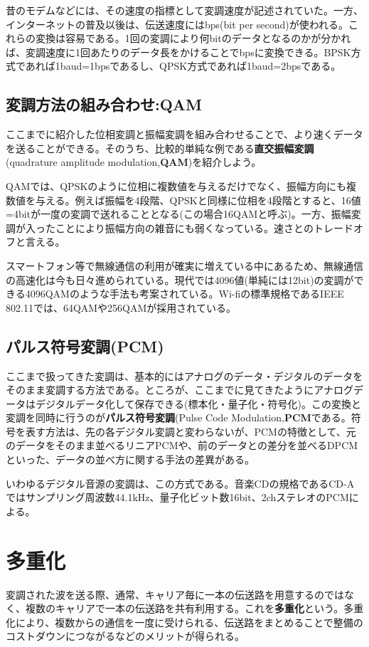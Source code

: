 昔のモデムなどには、その速度の指標として変調速度が記述されていた。一方、インターネットの普及以後は、伝送速度にはbps(bit per second)が使われる。これらの変換は容易である。1回の変調により何bitのデータとなるのかが分かれば、変調速度に1回あたりのデータ長をかけることでbpsに変換できる。BPSK方式であれば1baud=1bpsであるし、QPSK方式であれば1baud=2bpsである。

\subsection{変調方法の組み合わせ:QAM}
ここまでに紹介した位相変調と振幅変調を組み合わせることで、より速くデータを送ることができる。そのうち、比較的単純な例である\textbf{直交振幅変調}(quadrature amplitude modulation,\textbf{QAM})を紹介しよう。

QAMでは、QPSKのように位相に複数値を与えるだけでなく、振幅方向にも複数値を与える。例えば振幅を4段階、QPSKと同様に位相を4段階とすると、16値=4bitが一度の変調で送れることとなる(この場合16QAMと呼ぶ)。一方、振幅変調が入ったことにより振幅方向の雑音にも弱くなっている。速さとのトレードオフと言える。

スマートフォン等で無線通信の利用が確実に増えている中にあるため、無線通信の高速化は今も日々進められている。現代では4096値(単純には12bit)の変調ができる4096QAMのような手法も考案されている。Wi-fiの標準規格であるIEEE 802.11では、64QAMや256QAMが採用されている。

\subsection{パルス符号変調(PCM)}
ここまで扱ってきた変調は、基本的にはアナログのデータ・デジタルのデータをそのまま変調する方法である。ところが、ここまでに見てきたようにアナログデータはデジタルデータ化して保存できる(標本化・量子化・符号化)。この変換と変調を同時に行うのが\textbf{パルス符号変調}(Pulse Code Modulation,\textbf{PCM}である。符号を表す方法は、先の各デジタル変調と変わらないが、PCMの特徴として、元のデータをそのまま並べるリニアPCMや、前のデータとの差分を並べるDPCMといった、データの並べ方に関する手法の差異がある。

いわゆるデジタル音源の変調は、この方式である。音楽CDの規格であるCD-Aではサンプリング周波数44.1kHz、量子化ビット数16bit、2chステレオのPCMによる。

\section{多重化}
変調された波を送る際、通常、キャリア毎に一本の伝送路を用意するのではなく、複数のキャリアで一本の伝送路を共有利用する。これを\textbf{多重化}という。多重化により、複数からの通信を一度に受けられる、伝送路をまとめることで整備のコストダウンにつながるなどのメリットが得られる。


